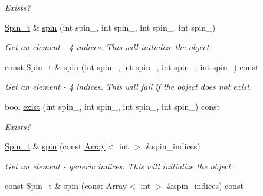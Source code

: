 \begin{DoxyCompactItemize}
\begin{DoxyCompactList}\small\item\em Exists? \end{DoxyCompactList}\item 
\mbox{\hyperlink{structHadron_1_1HadronDistOperatorRep__t_1_1Spin__t}{Spin\+\_\+t}} \& \mbox{\hyperlink{classHadron_1_1HadronDistOperatorRep__t_a9e487417c5103150be6302d8fd3024b9}{spin}} (int spin\+\_, int spin\+\_, int spin\+\_, int spin\+\_)
\begin{DoxyCompactList}\small\item\em Get an element -\/ 4 indices. This will initialize the object. \end{DoxyCompactList}\item 
const \mbox{\hyperlink{structHadron_1_1HadronDistOperatorRep__t_1_1Spin__t}{Spin\+\_\+t}} \& \mbox{\hyperlink{classHadron_1_1HadronDistOperatorRep__t_a4e5de005933a0604179b38b5aa483a77}{spin}} (int spin\+\_, int spin\+\_, int spin\+\_, int spin\+\_) const
\begin{DoxyCompactList}\small\item\em Get an element -\/ 4 indices. This will fail if the object does not exist. \end{DoxyCompactList}\item 
bool \mbox{\hyperlink{classHadron_1_1HadronDistOperatorRep__t_affb8fd51f21253d65fcc02b6517fd593}{exist}} (int spin\+\_, int spin\+\_, int spin\+\_, int spin\+\_) const
\begin{DoxyCompactList}\small\item\em Exists? \end{DoxyCompactList}\item 
\mbox{\hyperlink{structHadron_1_1HadronDistOperatorRep__t_1_1Spin__t}{Spin\+\_\+t}} \& \mbox{\hyperlink{classHadron_1_1HadronDistOperatorRep__t_a5a70f79b843bb042a113d74798c3ed3d}{spin}} (const \mbox{\hyperlink{classXMLArray_1_1Array}{Array}}$<$ int $>$ \&spin\+\_\+indices)
\begin{DoxyCompactList}\small\item\em Get an element -\/ generic indices. This will initialize the object. \end{DoxyCompactList}\item 
const \mbox{\hyperlink{structHadron_1_1HadronDistOperatorRep__t_1_1Spin__t}{Spin\+\_\+t}} \& \mbox{\hyperlink{classHadron_1_1HadronDistOperatorRep__t_a30c269c3646ef76094aecedcc745f611}{spin}} (const \mbox{\hyperlink{classXMLArray_1_1Array}{Array}}$<$ int $>$ \&spin\+\_\+indices) const

\end{DoxyCompactItemize}
